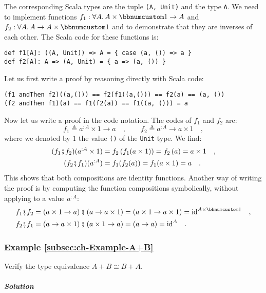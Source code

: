 The corresponding Scala types are the tuple \lstinline!(A, Unit)!
and the type \lstinline!A!. We need to implement functions $f_{1}:\forall A.\,A\times\bbnum 1\rightarrow A$
and $f_{2}:\forall A.\,A\rightarrow A\times\bbnum 1$ and to demonstrate
that they are inverses of each other. The Scala code for these functions
is:
\begin{lstlisting}
def f1[A]: ((A, Unit)) => A = { case (a, ()) => a }
def f2[A]: A => (A, Unit) = { a => (a, ()) }
\end{lstlisting}
Let us first write a proof by reasoning directly with Scala code:
\begin{lstlisting}
(f1 andThen f2)((a,())) == f2(f1((a,())) == f2(a) == (a, ())
(f2 andThen f1)(a) == f1(f2(a)) == f1((a, ())) = a
\end{lstlisting}
Now let us write a proof in the code notation. The codes of $f_{1}$
and $f_{2}$ are:
\[
f_{1}\triangleq a^{:A}\times1\rightarrow a\quad,\quad\quad f_{2}\triangleq a^{:A}\rightarrow a\times1\quad,
\]
where we denoted by $1$ the value \lstinline!()! of the \lstinline!Unit!
type. We find:
\begin{align*}
(f_{1}\bef f_{2})(a^{:A}\times1) & =f_{2}\left(f_{1}(a\times1)\right)=f_{2}\left(a\right)=a\times1\quad,\\
(f_{2}\bef f_{1})(a^{:A}) & =f_{1}(f_{2}(a))=f_{1}(a\times1)=a\quad.
\end{align*}
This shows that both compositions are identity functions. Another
way of writing the proof is by computing the function compositions
symbolically, without applying to a value $a^{:A}$:
\begin{align*}
f_{1}\bef f_{2} & =\left(a\times1\rightarrow a\right)\bef\left(a\rightarrow a\times1\right)=\left(a\times1\rightarrow a\times1\right)=\text{id}^{A\times\bbnum 1}\quad,\\
f_{2}\bef f_{1} & =\left(a\rightarrow a\times1\right)\bef\left(a\times1\rightarrow a\right)=\left(a\rightarrow a\right)=\text{id}^{A}\quad.
\end{align*}


\subsubsection{Example \label{subsec:ch-Example-A+B}\ref{subsec:ch-Example-A+B}}

Verify the type equivalence $A+B\cong B+A$.

\subparagraph{Solution}

